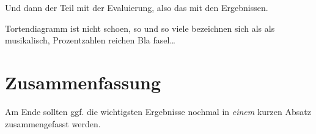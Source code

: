 Und dann der Teil mit der Evaluierung, also das mit den Ergebnissen.

Tortendiagramm ist nicht schoen, so und so viele bezeichnen sich als als musikalisch, Prozentzahlen reichen 
Bla fasel\ldots

\section{Zusammenfassung}
\label{ch:Entwurf:sec:zusammenfassung}

Am Ende sollten ggf. die wichtigsten Ergebnisse nochmal in \emph{einem}
kurzen Absatz zusammengefasst werden.

